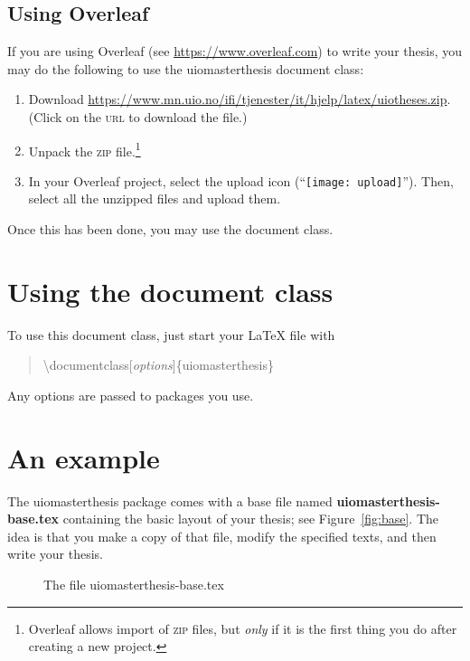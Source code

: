 \documentclass[UKenglish]{uiomasterthesis}
\newcommand{\bsl}{\textbackslash}
\newcommand{\p}[1]{\textsf{#1}}
\newcommand{\pb}[1]{\textbf{\p{#1}}}
\newcommand{\pcmd}[1]{\p{\bsl #1}}
\newcommand{\ppar}[1]{\p{\{#1\}}}
\begin{document}
\subsection{Using Overleaf}
If you are using Overleaf (see \url{https://www.overleaf.com}) to
write your thesis, you may do the following to use the \p{uiomasterthesis}
document class:
\begin{enumerate}
\item Download 
  \url{https://www.mn.uio.no/ifi/tjenester/it/hjelp/latex/uiotheses.zip}. (Click
  on the \textsc{url} to download the file.)

\item Unpack the \textsc{zip} file.\footnote{Overleaf allows import of
  \textsc{zip} files, but \emph{only} if it is the first thing you do
  after creating a new project.}

\item In your Overleaf project, select the upload icon
  (``\texttt{[image: upload]}''). Then, select all the
  unzipped files and upload them.
\end{enumerate}
Once this has been done, you may use the document class.

\section{Using the document class}
To use this document class, just start your \LaTeX{} file with
\begin{quote}
  \pcmd{documentclass[\emph{options}]}\ppar{uiomasterthesis}
\end{quote}
Any options are passed to packages you use.

\section{An example}
The \p{uiomasterthesis} package comes with a base file named
\pb{uiomasterthesis-base.tex} containing the basic layout of your thesis;
see Figure~\vref{fig:base}. The idea is that you make a copy of that
file, modify the specified texts, and then write your thesis.

\begin{figure}[htp]
  \VerbatimInput[fontsize=\footnotesize,frame=single,obeytabs,
    label={\pb{uiomasterthesis-base.tex}},numbers=left]{uiomasterthesis-base.tex}
  \caption{The file \p{uiomasterthesis-base.tex}\label{fig:base}}
\end{figure}
\end{document}
